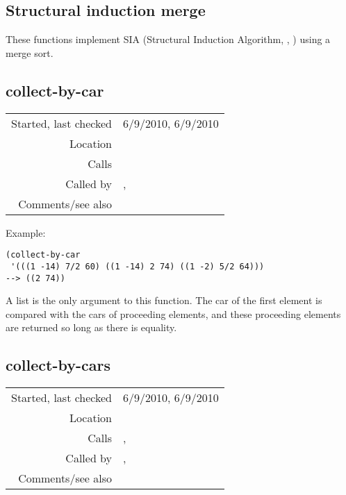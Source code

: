 \subsection{Structural induction merge}\label{sec:structural-induction-merge}

These functions implement SIA (Structural Induction
Algorithm, \citeauthor{meredith2002},
\citeyear{meredith2002}) using a merge sort.


\subsection*{collect-by-car}\label{fun:collect-by-car}

\vspace{0.3cm}
\begin{tabular}{r|p{8cm}}
Started, last checked & 6/9/2010, 6/9/2010 \\
Location & \nameref{sec:structural-induction-merge} \\
Calls & \\
Called by & \nameref{fun:collect-by-cars}, \nameref{fun:collect-by-cars-partition} \\
Comments/see also &
\end{tabular}

\vspace{0.5cm}
\noindent Example:
\begin{verbatim}
(collect-by-car
 '(((1 -14) 7/2 60) ((1 -14) 2 74) ((1 -2) 5/2 64)))
--> ((2 74))
\end{verbatim}

\noindent A list is the only argument to this
function. The car of the first element is compared
with the cars of proceeding elements, and these
proceeding elements are returned so long as there is
equality.


\subsection*{collect-by-cars}\label{fun:collect-by-cars}

\vspace{0.3cm}
\begin{tabular}{r|p{8cm}}
Started, last checked & 6/9/2010, 6/9/2010 \\
Location & \nameref{sec:structural-induction-merge} \\
Calls & \nameref{fun:collect-by-car}, \nameref{fun:restn} \\
Called by & \nameref{fun:collect-by-cars-partition},\newline \nameref{fun:SIA-reflected-merge-sort} \\
Comments/see also &
\end{tabular}

